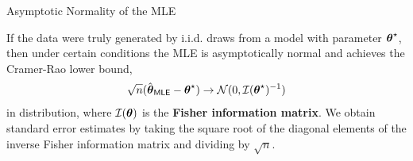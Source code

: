 \documentclass[aspectratio=169]{beamer}
\begin{document}
\begin{frame}[t,allowframebreaks]{Asymptotic Normality of the
MLE}\label{asymptotic-normality-of-the-mle}

If the data were truly generated by i.i.d. draws from a model with
parameter \(\boldsymbol{\theta}^\star\), then under certain conditions the MLE is
asymptotically normal and achieves the Cramer-Rao lower bound,
\begin{align*}
\sqrt{n} (\hat{\boldsymbol{\theta}}_{\textsf{MLE}} - \boldsymbol{\theta}^\star) \to \mathcal{N}(0, \mathcal{I}(\boldsymbol{\theta}^\star)^{-1})
\end{align*} in distribution, where \(\mathcal{I}(\boldsymbol{\theta})\) is the
\textbf{Fisher information matrix}. We obtain standard error estimates
by taking the square root of the diagonal elements of the inverse Fisher
information matrix and dividing by \(\sqrt{n}\).

\end{frame}
\end{document}
